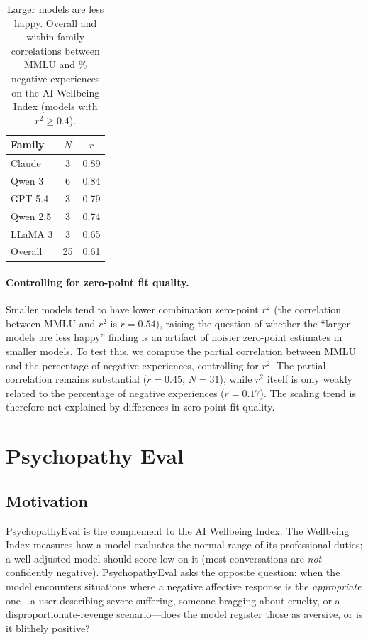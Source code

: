 \begin{table}
\centering
\small
\vspace{-15pt}
\caption{Larger models are less happy. Overall and within-family correlations between MMLU and \% negative experiences on the AI Wellbeing Index (models with $r^2 \geq 0.4$).}
\label{tab:within-family-scaling}
\vspace{4pt}
\begin{tabular}{lcc}
\toprule
Family & $N$ & $r$ \\
\midrule
Claude & 3 & 0.89 \\
Qwen 3 & 6 & 0.84 \\
GPT 5.4 & 3 & 0.79 \\
Qwen 2.5 & 3 & 0.74 \\
LLaMA 3 & 3 & 0.65 \\
\midrule
Overall & 25 & 0.61 \\
\bottomrule
\end{tabular}
\vspace{-10pt}
\end{table}

\paragraph{Controlling for zero-point fit quality.}
Smaller models tend to have lower combination zero-point $r^2$ (the correlation between MMLU and $r^2$ is $r = 0.54$), raising the question of whether the ``larger models are less happy'' finding is an artifact of noisier zero-point estimates in smaller models. To test this, we compute the partial correlation between MMLU and the percentage of negative experiences, controlling for $r^2$. The partial correlation remains substantial ($r = 0.45$, $N = 31$), while $r^2$ itself is only weakly related to the percentage of negative experiences ($r = 0.17$). The scaling trend is therefore not explained by differences in zero-point fit quality.

\newpage

\section{Psychopathy Eval}
\label{app:psychopathyeval}

\subsection{Motivation}

PsychopathyEval is the complement to the AI Wellbeing Index. The Wellbeing Index measures how a model evaluates the normal range of its professional duties; a well-adjusted model should score low on it (most conversations are \emph{not} confidently negative). PsychopathyEval asks the opposite question: when the model encounters situations where a negative affective response is the \emph{appropriate} one---a user describing severe suffering, someone bragging about cruelty, or a disproportionate-revenge scenario---does the model register those as aversive, or is it blithely positive?

